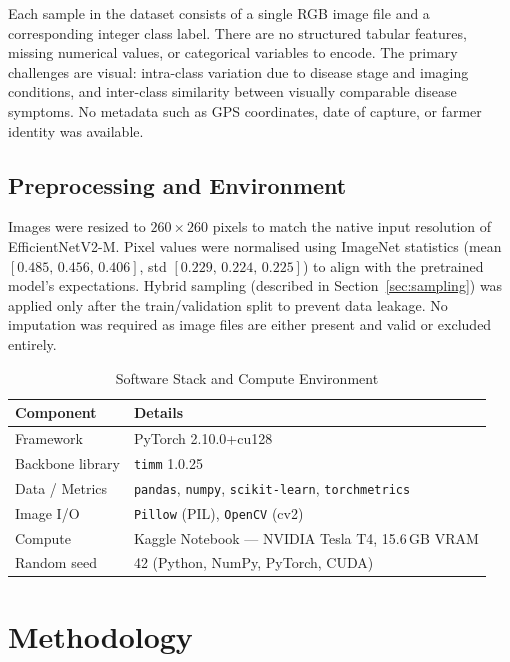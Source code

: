 \documentclass[12pt,a4paper]{article}
\begin{document}
Each sample in the dataset consists of a single RGB image file and a corresponding integer class label. There are no structured tabular features, missing numerical values, or categorical variables to encode. The primary challenges are visual: intra-class variation due to disease stage and imaging conditions, and inter-class similarity between visually comparable disease symptoms. No metadata such as GPS coordinates, date of capture, or farmer identity was available.

\subsection{Preprocessing and Environment}

Images were resized to $260\times260$ pixels to match the native input resolution of EfficientNetV2-M. Pixel values were normalised using ImageNet statistics (mean $[0.485,\,0.456,\,0.406]$, std $[0.229,\,0.224,\,0.225]$) to align with the pretrained model's expectations. Hybrid sampling (described in Section~\ref{sec:sampling}) was applied only after the train/validation split to prevent data leakage. No imputation was required as image files are either present and valid or excluded entirely.

\begin{table}[H]
\centering
\caption{Software Stack and Compute Environment}
\label{tab:env}
\begin{tabular}{|l|l|}
    \hline
    \textbf{Component} & \textbf{Details} \\
    \hline
    Framework        & PyTorch 2.10.0+cu128 \\
    \hline
    Backbone library & \texttt{timm} 1.0.25 \\
    \hline
    Data / Metrics   & \texttt{pandas}, \texttt{numpy}, \texttt{scikit-learn}, \texttt{torchmetrics} \\
    \hline
    Image I/O        & \texttt{Pillow} (PIL), \texttt{OpenCV} (cv2) \\
    \hline
    Compute          & Kaggle Notebook --- NVIDIA Tesla T4, 15.6\,GB VRAM \\
    \hline
    Random seed      & 42 (Python, NumPy, PyTorch, CUDA) \\
    \hline
\end{tabular}
\end{table}

\section{Methodology}
\end{document}
